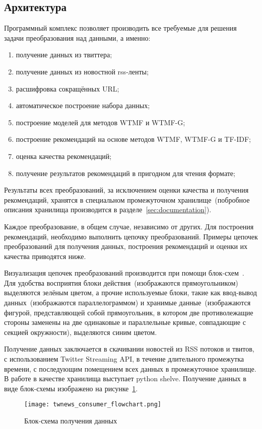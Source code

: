 \subsection{Архитектура}
    Программный комплекс позволяет производить все требуемые для решения задачи преобразования над данными, а именно:
    \begin{enumerate}
        \item получение данных из твиттера;
        \item получение данных из новостной rss-ленты;
        \item расшифровка сокращённых URL;
        \item автоматическое построение набора данных;
        \item построение моделей для методов WTMF и WTMF-G;
        \item построение рекомендаций на основе методов WTMF, WTMF-G и TF-IDF;
        \item оценка качества рекомендаций;
        \item получение результатов рекомендаций в пригодном для чтения формате;
    \end{enumerate}
    Результаты всех преобразований, за исключением оценки качества и получения рекомендаций, хранятся в специальном промежуточном
    хранилище~(побробное описания хранилища производится в разделе~\ref{sec:documentation}).

    Каждое преобразование, в общем случае, независимо от других.
    Для построения рекомендаций, необходимо выполнить цепочку преобразований.
    Примеры цепочек преобразований для получения данных, построения рекомендаций и оценки их качества приводятся ниже.
    
    Визуализация цепочек преобразований производится при помощи блок-схем~\cite{flowchart_gost}.
    Для удобства восприятия блоки действия~(изображаются прямоугольником) выделяются зелёным цветом, 
    а прочие используемые блоки, такие как ввод-вывод данных~(изображаются параллелограммом) и хранимые 
    данные~(изображаются фигурой, представляющей собой прямоугольник, в котором две противолежащие стороны 
    заменены на две одинаковые и параллельные кривые, совпадающие с секцией окружности), выделяются синим цветом.
    
    Получение данных заключается в скачивании новостей из RSS потоков и твитов, с использованием Twitter Streaming API, в течение длительного промежутка времени, с последующим помещением всех данных в промежуточное хранилище. В работе в качестве хранилища выступает python shelve.
    Получение данных в виде блок-схемы изображено на рисунке~\ref{pic:consumer_flowchart}.
    \begin{figure}[h!]
            \center
            \texttt{[image: twnews\_consumer\_flowchart.png]}
            \caption{Блок-схема получения данных}
            \label{pic:consumer_flowchart}
    \end{figure}

